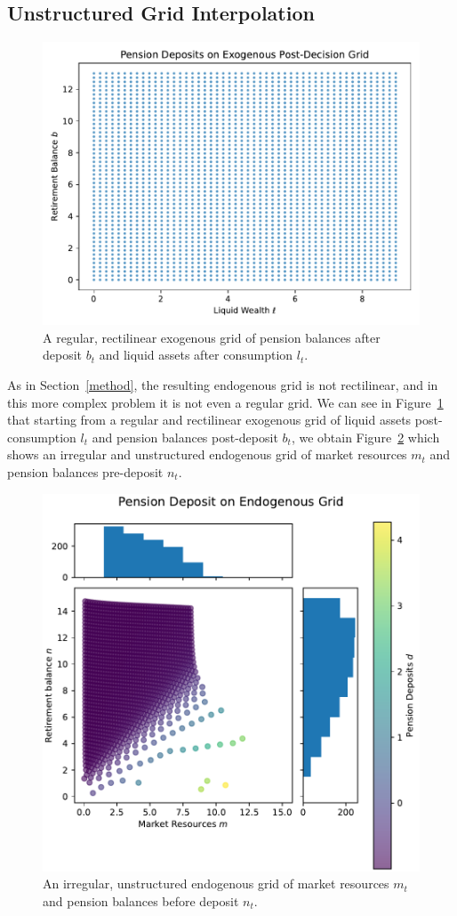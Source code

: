 \documentclass{article}
\newcommand{\bRat}{b}
\newcommand{\mRat}{m}
\newcommand{\nRat}{n}
\newcommand{\lRat}{l}
\begin{document}
\subsection{Unstructured Grid Interpolation}\label{Unstructured Grid Interpolation}

\begin{figure}[!htbp]
\centering
\includegraphics[width=0.7\linewidth]{files/SparsePensionExogeno-b1a576a152b8659c0c1923b3d2a8021e.pdf}
\caption{A regular, rectilinear exogenous grid of pension balances after deposit $\bRat_{t}$ and liquid assets after consumption $\lRat_{t}$.}
\label{fig:exog}
\end{figure}

As in Section~\ref{method}, the resulting endogenous grid is not rectilinear, and in this more complex problem it is not even a regular grid. We can see in  Figure~\ref{fig:exog} that starting from a regular and rectilinear exogenous grid of liquid assets post-consumption $\lRat_{t}$ and pension balances post-deposit $\bRat_{t}$, we obtain Figure~\ref{fig:endog} which shows an irregular and unstructured endogenous grid of market resources $\mRat_{t}$ and pension balances pre-deposit $\nRat_{t}$.

\begin{figure}[!htbp]
\centering
\includegraphics[width=0.7\linewidth]{files/PensionEndogenousGri-e52c966eeee723c6c704e24fed97104f.pdf}
\caption{An irregular, unstructured endogenous grid of market resources $\mRat_{t}$ and pension balances before deposit $\nRat_{t}$.}
\label{fig:endog}
\end{figure}
\end{document}
